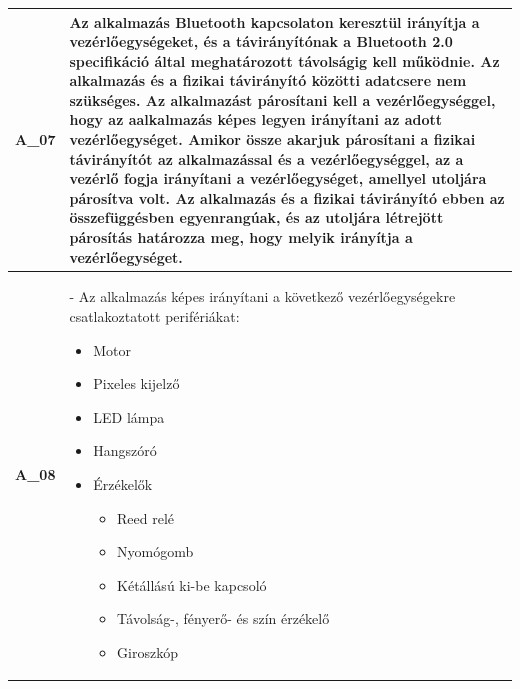\documentclass{article}
\begin{document}
\begin{longtable}{|c|p{14cm}|}
       \textbf{A\_07}  & Az alkalmazás Bluetooth kapcsolaton keresztül irányítja a vezérlőegységeket, és a távirányítónak a Bluetooth 2.0 specifikáció által meghatározott távolságig kell működnie. Az alkalmazás és a fizikai távirányító közötti adatcsere nem szükséges. Az alkalmazást párosítani kell a vezérlőegységgel, hogy az aalkalmazás képes legyen irányítani az adott vezérlőegységet. Amikor össze akarjuk párosítani a fizikai távirányítót az alkalmazással és a vezérlőegységgel, az a vezérlő fogja irányítani a vezérlőegységet, amellyel utoljára párosítva volt. Az alkalmazás és a fizikai távirányító ebben az összefüggésben egyenrangúak, és az utoljára létrejött párosítás határozza meg, hogy melyik irányítja a vezérlőegységet. \\\hline
       
       \textbf{A\_08}  & - Az alkalmazás képes irányítani a következő vezérlőegységekre csatlakoztatott perifériákat:
       \begin{itemize}
       \item Motor
       \item Pixeles kijelző
       \item LED lámpa
       \item Hangszóró
       \item Érzékelők
         \begin{itemize}
         \item Reed relé
         \item Nyomógomb
         \item Kétállású ki-be kapcsoló
         \item Távolság-, fényerő- és szín érzékelő
         \item Giroszkóp
         \end{itemize}
       \end{itemize} \\\hline


\end{longtable}
\end{document}
